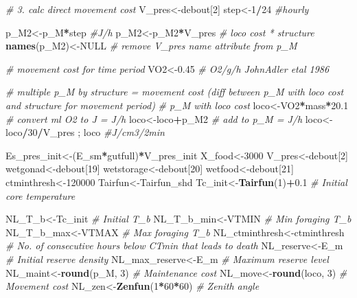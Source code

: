 \documentclass[]{article}
\newenvironment{Shaded}{\begin{snugshade}}{\end{snugshade}}
\newcommand{\KeywordTok}[1]{\textcolor[rgb]{0.13,0.29,0.53}{\textbf{#1}}}
\newcommand{\DecValTok}[1]{\textcolor[rgb]{0.00,0.00,0.81}{#1}}
\newcommand{\FloatTok}[1]{\textcolor[rgb]{0.00,0.00,0.81}{#1}}
\newcommand{\CommentTok}[1]{\textcolor[rgb]{0.56,0.35,0.01}{\textit{#1}}}
\newcommand{\OtherTok}[1]{\textcolor[rgb]{0.56,0.35,0.01}{#1}}
\newcommand{\OperatorTok}[1]{\textcolor[rgb]{0.81,0.36,0.00}{\textbf{#1}}}
\newcommand{\NormalTok}[1]{#1}
\begin{document}
\begin{Shaded}
\begin{Highlighting}[]
\CommentTok{# 3. calc direct movement cost}
\NormalTok{V_pres<-debout[}\DecValTok{2}\NormalTok{]}
\NormalTok{step<-}\DecValTok{1}\OperatorTok{/}\DecValTok{24} \CommentTok{#hourly}

\NormalTok{p_M2<-p_M}\OperatorTok{*}\NormalTok{step }\CommentTok{#J/h}
\NormalTok{p_M2<-p_M2}\OperatorTok{*}\NormalTok{V_pres }\CommentTok{# loco cost * structure}
\KeywordTok{names}\NormalTok{(p_M2)<-}\OtherTok{NULL} \CommentTok{# remove V_pres name attribute from p_M}

\CommentTok{# movement cost for time period}
\NormalTok{VO2<-}\FloatTok{0.45} \CommentTok{# O2/g/h JohnAdler etal 1986}

\CommentTok{# multiple p_M by structure = movement cost (diff between p_M with loco cost and structure for movement period)}
\CommentTok{# p_M with loco cost }
\NormalTok{loco<-VO2}\OperatorTok{*}\NormalTok{mass}\OperatorTok{*}\FloatTok{20.1} \CommentTok{# convert ml O2 to J = J/h }
\NormalTok{loco<-loco}\OperatorTok{+}\NormalTok{p_M2 }\CommentTok{# add to p_M = J/h}
\NormalTok{loco<-loco}\OperatorTok{/}\DecValTok{30}\OperatorTok{/}\NormalTok{V_pres ; loco }\CommentTok{#J/cm3/2min}

\NormalTok{Es_pres_init<-(E_sm}\OperatorTok{*}\NormalTok{gutfull)}\OperatorTok{*}\NormalTok{V_pres_init}
\NormalTok{X_food<-}\DecValTok{3000}
\NormalTok{V_pres<-debout[}\DecValTok{2}\NormalTok{]}
\NormalTok{wetgonad<-debout[}\DecValTok{19}\NormalTok{]}
\NormalTok{wetstorage<-debout[}\DecValTok{20}\NormalTok{]}
\NormalTok{wetfood<-debout[}\DecValTok{21}\NormalTok{]}
\NormalTok{ctminthresh<-}\DecValTok{120000}
\NormalTok{Tairfun<-Tairfun_shd}
\NormalTok{Tc_init<-}\KeywordTok{Tairfun}\NormalTok{(}\DecValTok{1}\NormalTok{)}\OperatorTok{+}\FloatTok{0.1} \CommentTok{# Initial core temperature}

\NormalTok{NL_T_b<-Tc_init       }\CommentTok{# Initial T_b}
\NormalTok{NL_T_b_min<-VTMIN         }\CommentTok{# Min foraging T_b}
\NormalTok{NL_T_b_max<-VTMAX        }\CommentTok{# Max foraging T_b}
\NormalTok{NL_ctminthresh<-ctminthresh }\CommentTok{# No. of consecutive hours below CTmin that leads to death}
\NormalTok{NL_reserve<-E_m        }\CommentTok{# Initial reserve density}
\NormalTok{NL_max_reserve<-E_m    }\CommentTok{# Maximum reserve level}
\NormalTok{NL_maint<-}\KeywordTok{round}\NormalTok{(p_M, }\DecValTok{3}\NormalTok{)               }\CommentTok{# Maintenance cost}
\NormalTok{NL_move<-}\KeywordTok{round}\NormalTok{(loco, }\DecValTok{3}\NormalTok{)               }\CommentTok{# Movement cost}
\NormalTok{NL_zen<-}\KeywordTok{Zenfun}\NormalTok{(}\DecValTok{1}\OperatorTok{*}\DecValTok{60}\OperatorTok{*}\DecValTok{60}\NormalTok{)     }\CommentTok{# Zenith angle}


\end{Highlighting}
\end{Shaded}
\end{document}
